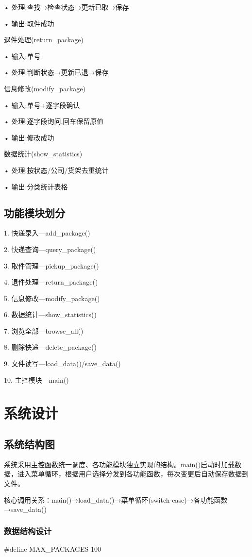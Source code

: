• 处理:查找→检查状态→更新已取→保存

• 输出:取件成功

退件处理(return\_package)

• 输入:单号

• 处理:判断状态→更新已退→保存

信息修改(modify\_package)

• 输入:单号+逐字段确认

• 处理:逐字段询问,回车保留原值

• 输出:修改成功

数据统计(show\_statistics)

• 处理:按状态/公司/货架去重统计

• 输出:分类统计表格

\subsection{功能模块划分}
1. 快递录入—add\_package()

2. 快递查询—query\_package()

3. 取件管理—pickup\_package()

4. 退件处理—return\_package()

5. 信息修改—modify\_package()

6. 数据统计—show\_statistics()

7. 浏览全部—browse\_all()

8. 删除快递—delete\_package()

9. 文件读写—load\_data()/save\_data()

10. 主控模块—main()

\section{系统设计}
\subsection{系统结构图}
系统采用主控函数统一调度、各功能模块独立实现的结构。main()启动时加载数据，进入菜单循环，根据用户选择分发到各功能函数，每次变更后自动保存数据到文件。

核心调用关系：main()→load\_data()→菜单循环(switch-case)→各功能函数→save\_data()

\subsubsection{数据结构设计}
\#define MAX\_PACKAGES 100

